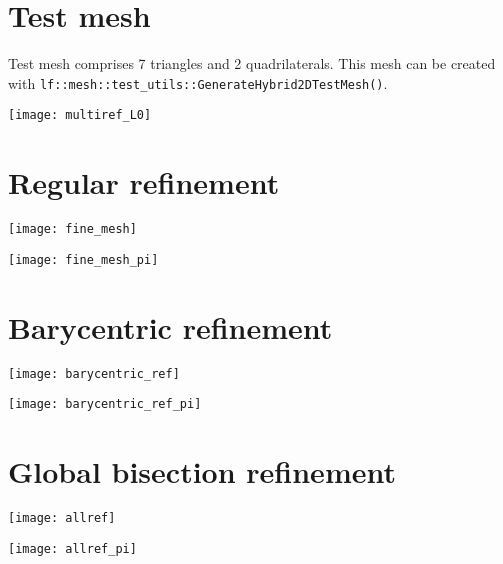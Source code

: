 \documentclass[12pt]{article}
\begin{document}
\section{Test mesh}

Test mesh comprises 7 triangles and 2 quadrilaterals. This mesh can be
created with \texttt{lf::mesh::test\_utils::GenerateHybrid2DTestMesh()}.

\texttt{[image: multiref\_L0]}

\section{Regular refinement}

\begin{minipage}[c]{0.5\textwidth}
  \texttt{[image: fine\_mesh]}
 \end{minipage}%
\begin{minipage}[c]{0.5\textwidth}
  \texttt{[image: fine\_mesh\_pi]}
\end{minipage}%

\section{Barycentric refinement}

\begin{minipage}[c]{0.5\textwidth}
  \texttt{[image: barycentric\_ref]}
 \end{minipage}%
\begin{minipage}[c]{0.5\textwidth}
  \texttt{[image: barycentric\_ref\_pi]}
\end{minipage}%

\section{Global bisection refinement}

\begin{minipage}[c]{0.5\textwidth}
  \texttt{[image: allref]}
 \end{minipage}%
\begin{minipage}[c]{0.5\textwidth}
  \texttt{[image: allref\_pi]}
\end{minipage}%
 
\end{document}
